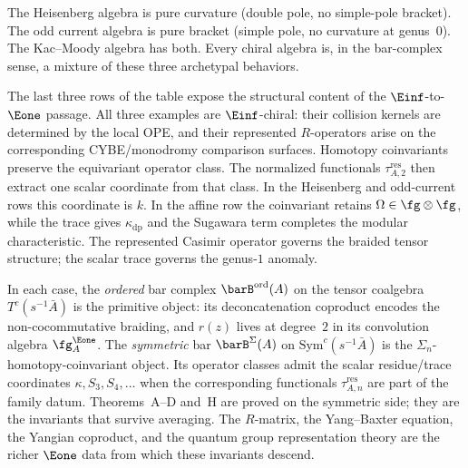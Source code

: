 The Heisenberg algebra is pure curvature (double pole, no simple-pole bracket).
The odd current algebra is pure bracket (simple pole, no curvature at
genus~$0$).
The Kac--Moody algebra has both. Every chiral algebra is, in the
bar-complex sense, a mixture of these three archetypal behaviors.

The last three rows of the table expose the structural content of
the $\Einf$-to-$\Eone$ passage.
All three examples are $\Einf$-chiral: their collision kernels are
determined by the local OPE, and their represented $R$-operators arise
on the corresponding CYBE/monodromy comparison surfaces.  Homotopy
coinvariants preserve the equivariant operator class.  The normalized
functionals $\tau_{A,2}^{\mathrm{res}}$ then extract one scalar
coordinate from that class.  In the Heisenberg and odd-current rows
this coordinate is $k$.  In the affine row the coinvariant retains
$\Omega\in\fg\otimes\fg$, while the trace gives
$\kappa_{\mathrm{dp}}$ and the Sugawara term completes the modular
characteristic.  The represented Casimir operator governs the braided
tensor structure; the scalar trace governs the genus-$1$ anomaly.

In each case, the \emph{ordered} bar complex $\barB^{\mathrm{ord}}(A)$
on the tensor coalgebra $T^c(s^{-1}\bar{A})$ is the primitive
object: its deconcatenation coproduct encodes the non-cocommutative
braiding, and $r(z)$ lives at degree~$2$ in its convolution algebra
$\fg^{\Eone}_A$. The \emph{symmetric} bar
$\barB^{\Sigma}(A)$ on $\mathrm{Sym}^c(s^{-1}\bar{A})$
is the $\Sigma_n$-homotopy-coinvariant object.  Its operator classes
admit the scalar residue/trace coordinates $\kappa,S_3,S_4,\ldots$
when the corresponding functionals $\tau_{A,n}^{\mathrm{res}}$ are
part of the family datum.
Theorems~A--D and~H are proved on the symmetric side;
they are the invariants that survive averaging. The $R$-matrix, the
Yang--Baxter equation, the Yangian coproduct, and the quantum
group representation theory are the richer $\Eone$ data
from which these invariants descend.


